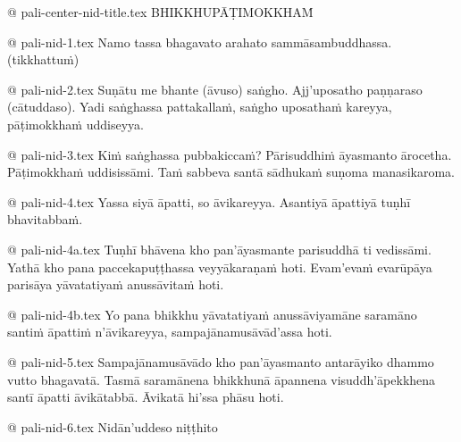 @ pali-center-nid-title.tex
﻿BHIKKHUPĀṬIMOKKHAṀ

@ pali-nid-1.tex
Namo tassa bhagavato arahato sammāsambuddhassa.
(tikkhattuṁ)

@ pali-nid-2.tex
Suṇātu me bhante (āvuso) saṅgho. Ajj’uposatho paṇṇaraso (cātuddaso). Yadi saṅghassa pattakallaṁ, saṅgho uposathaṁ kareyya, pāṭimokkhaṁ uddiseyya.

@ pali-nid-3.tex
Kiṁ saṅghassa pubbakiccaṁ? Pārisuddhiṁ āyasmanto ārocetha. Pāṭimokkhaṁ uddisissāmi. Taṁ sabbeva santā sādhukaṁ suṇoma manasikaroma.

@ pali-nid-4.tex
Yassa siyā āpatti, so āvikareyya. Asantiyā āpattiyā tuṇhī bhavitabbaṁ. 

@ pali-nid-4a.tex
Tuṇhī bhāvena kho pan’āyasmante parisuddhā ti vedissāmi. Yathā kho pana paccekapuṭṭhassa veyyākaraṇaṁ hoti. Evam’evaṁ evarūpāya parisāya yāvatatiyaṁ anussāvitaṁ hoti.

@ pali-nid-4b.tex
Yo pana bhikkhu yāvatatiyaṁ anussāviyamāne saramāno santiṁ āpattiṁ n’āvikareyya, sampajānamusāvād’assa hoti.

@ pali-nid-5.tex
Sampajānamusāvādo kho pan’āyasmanto antarāyiko dhammo vutto bhagavatā. Tasmā saramānena bhikkhunā āpannena visuddh’āpekkhena santī āpatti āvikātabbā. Āvikatā hi’ssa phāsu hoti.

@ pali-nid-6.tex
Nidān’uddeso niṭṭhito
